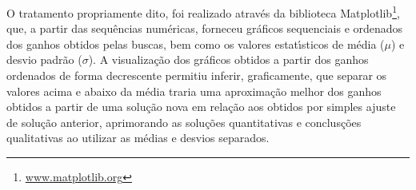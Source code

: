 O tratamento propriamente dito, foi realizado atrav{\'e}s da biblioteca Matplotlib\footnote{\url{www.matplotlib.org}}, que, a partir das sequ{\^e}ncias num{\'e}ricas, forneceu gr{\'a}ficos sequenciais e ordenados dos ganhos obtidos pelas buscas, bem como os valores estat{\'\i}sticos de m{\'e}dia ($\mu$) e desvio padr{\~a}o ($\sigma$). A visualiza{\c c}{\~a}o dos gr{\'a}ficos obtidos a partir dos ganhos ordenados de forma decrescente permitiu inferir, graficamente, que separar os valores acima e abaixo da m{\'e}dia traria uma aproxima{\c c}{\~a}o melhor dos ganhos obtidos a partir de uma solu{\c c}{\~a}o nova em rela{\c c}{\~a}o aos obtidos por simples ajuste de solu{\c c}{\~a}o anterior, aprimorando as solu{\c c}{\~o}es quantitativas e conclus{\c c}{\~o}es qualitativas ao utilizar as m{\'e}dias e desvios separados.

